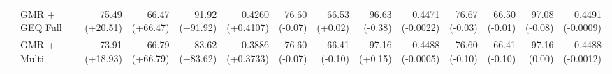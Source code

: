 \documentclass{article}
\begin{document}
{\begin{tabular}{llrrrrrrrrrrrr}
 & GMR + GEQ Full & \shortstack{75.49 \\ {\scriptsize\textcolor{Gain}{(+20.51)}}} & \shortstack{66.47 \\ {\scriptsize\textcolor{Gain}{(+66.47)}}} & \shortstack{91.92 \\ {\scriptsize\textcolor{Gain}{(+91.92)}}} & \shortstack{0.4260 \\ {\scriptsize\textcolor{Gain}{(+0.4107)}}} & \shortstack{76.60 \\ {\scriptsize\textcolor{Loss}{(-0.07)}}} & \shortstack{66.53 \\ {\scriptsize\textcolor{Gain}{(+0.02)}}} & \shortstack{96.63 \\ {\scriptsize\textcolor{Loss}{(-0.38)}}} & \shortstack{0.4471 \\ {\scriptsize\textcolor{Loss}{(-0.0022)}}} & \shortstack{76.67 \\ {\scriptsize\textcolor{Loss}{(-0.03)}}} & \shortstack{66.50 \\ {\scriptsize\textcolor{Loss}{(-0.01)}}} & \shortstack{97.08 \\ {\scriptsize\textcolor{Loss}{(-0.08)}}} & \shortstack{0.4491 \\ {\scriptsize\textcolor{Loss}{(-0.0009)}}} \\
 & GMR + Multi & \shortstack{73.91 \\ {\scriptsize\textcolor{Gain}{(+18.93)}}} & \shortstack{66.79 \\ {\scriptsize\textcolor{Gain}{(+66.79)}}} & \shortstack{83.62 \\ {\scriptsize\textcolor{Gain}{(+83.62)}}} & \shortstack{0.3886 \\ {\scriptsize\textcolor{Gain}{(+0.3733)}}} & \shortstack{76.60 \\ {\scriptsize\textcolor{Loss}{(-0.07)}}} & \shortstack{66.41 \\ {\scriptsize\textcolor{Loss}{(-0.10)}}} & \shortstack{97.16 \\ {\scriptsize\textcolor{Gain}{(+0.15)}}} & \shortstack{0.4488 \\ {\scriptsize\textcolor{Loss}{(-0.0005)}}} & \shortstack{76.60 \\ {\scriptsize\textcolor{Loss}{(-0.10)}}} & \shortstack{66.41 \\ {\scriptsize\textcolor{Loss}{(-0.10)}}} & \shortstack{97.16 \\ {\scriptsize\textcolor{Zero}{(0.00)}}} & \shortstack{0.4488 \\ {\scriptsize\textcolor{Loss}{(-0.0012)}}} \\

\end{tabular}}
\end{document}
